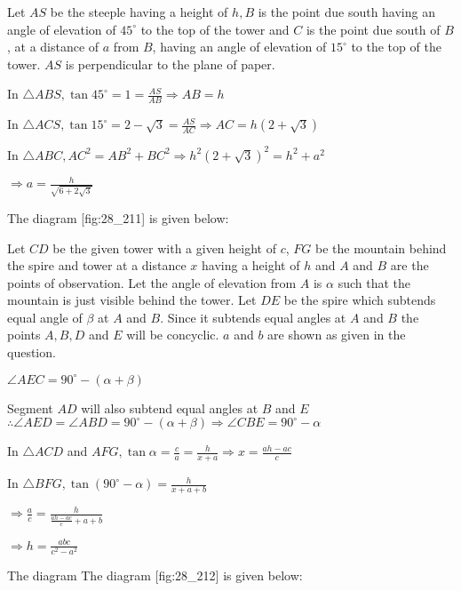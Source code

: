   Let $AS$ be the steeple having a height of $h, B$ is the point due south having an angle of
  elevation of $45^\circ$ to the top of the tower and $C$ is the point due south of
  $B$, at a distance of $a$ from $B$, having an angle of elevation of $15^\circ$
  to the top of the tower. $AS$ is perpendicular to the plane of paper.

  In $\triangle ABS, \tan45^\circ = 1 = \frac{AS}{AB}\Rightarrow AB = h$

  In $\triangle ACS, \tan15^\circ = 2 - \sqrt{3} = \frac{AS}{AC} \Rightarrow AC = h(2 + \sqrt{3})$

  In $\triangle ABC, AC^2 = AB^2 + BC^2 \Rightarrow h^2(2 + \sqrt{3})^2 = h^2 + a^2$

  $\Rightarrow a = \frac{h}{\sqrt{6 + 2\sqrt{3}}}$

\item The diagram [fig:28_211] is given below:

  \startplacefigure[reference=fig:28_211]
    \externalfigure[28_211.pdf]
  \stopplacefigure

  Let $CD$ be the given tower with a given height of $c$, $FG$ be the mountain behind
  the spire and tower at a distance $x$ having a height of $h$ and $A$ and $B$
  are the points of observation. Let the angle of elevation from $A$ is $\alpha$ such that
  the mountain is just visible behind the tower. Let $DE$ be the spire which subtends equal angle
  of $\beta$ at $A$ and $B$. Since it subtends equal angles at $A$ and $B$
  the points $A, B, D$ and $E$ will be concyclic. $a$ and $b$ are shown as given
  in the question.

  $\angle AEC = 90^\circ - (\alpha + \beta)$

  Segment $AD$ will also subtend equal angles at $B$ and $E$ $\therefore \angle
  AED = \angle ABD = 90^\circ - (\alpha + \beta) \Rightarrow \angle CBE = 90^\circ - \alpha$

  In $\triangle ACD$ and $AFG, \tan\alpha = \frac{c}{a} = \frac{h}{x + a} \Rightarrow x =
  \frac{ah - ac}{c}$

  In $\triangle BFG, \tan(90^\circ - \alpha) = \frac{h}{x + a + b}$

  $\Rightarrow \frac{a}{c} = \frac{h}{\frac{ah - ac}{c} + a + b}$

  $\Rightarrow h = \frac{abc}{c^2 - a^2}$

\item The diagram The diagram [fig:28_212] is given below:

  \startplacefigure[reference=fig:28_212]
    \externalfigure[28_212.pdf]
  \stopplacefigure


